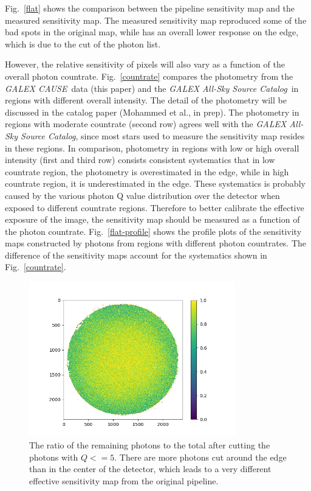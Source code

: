 \documentclass[12pt, preprint]{aastex}
\newcommand{\project}[1]{\textsl{#1}}
\newcommand{\asc}{\project{GALEX All-Sky Source Catalog}}
\newcommand{\cause}{\project{GALEX CAUSE}}
\begin{document}
Fig.~\ref{flat} shows the comparison between the pipeline sensitivity map and the measured sensitivity map.
The measured sensitivity map reproduced some of the bad spots in the original map, while has an overall lower response on the edge, which is due to the cut of the photon list.

However, the relative sensitivity of pixels will also vary as a function of the overall photon countrate.
Fig.~\ref{countrate} compares the photometry from the \cause\ data (this paper) and the \asc\ in regions with different overall intensity.
The detail of the photometry will be discussed in the catalog paper (Mohammed et al., in prep).
The photometry in regions with moderate countrate (second row) agrees well with the \asc, since most stars used to measure the sensitivity map resides in these regions.
In comparison, photometry in regions with low or high overall intensity (first and third row) consists consistent systematics that in low countrate region, the photometry is overestimated in the edge, while in high countrate region, it is underestimated in the edge.
These systematics is probably caused by the various photon Q value distribution over the detector when exposed to different countrate regions.
Therefore to better calibrate the effective exposure of the image, the sensitivity map should be measured as a function of the photon countrate.
Fig.~\ref{flat-profile} shows the profile plots of the sensitivity maps constructed by photons from regions with different photon countrates.
The difference of the sensitivity maps account for the systematics shown in Fig.~\ref{countrate}.

\begin{figure}[p]
\begin{center}
\includegraphics[width=0.8\textwidth]{figures/q50}
\end{center}
\caption{
  \label{qcut}
  The ratio of the remaining photons to the total after cutting the photons with $Q<=5$.
  There are more photons cut around the edge than in the center of the detector, which leads to a very different effective sensitivity map from the original pipeline.
}
\end{figure}
\end{document}

